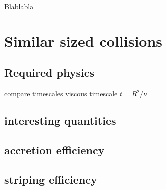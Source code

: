 \graphicspath{{./03figs/}}

Blablabla

\newpage

\chapter{Similar sized collisions}

%

\section{Required physics}
compare timescales
viscous timescale $t = R^2 / \nu$

\section{interesting quantities}

\section{accretion efficiency}

\section{striping efficiency}


\SSC 
\textsf{\SSC}





